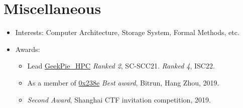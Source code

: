 \documentclass{resume}
\newcommand{\en}[1]{#1}
\newcommand{\zh}[1]{}
\begin{document}
\section{\en{Miscellaneous}\zh{其他}}
\begin{itemize}
      \item \en{Interests: Computer Architecture, Storage System, Formal Methods, etc.}
            \zh{兴趣：高性能计算、体系结构、存储、形式化验证安全等。}
      \item \en{Awards:}
      \zh{所获奖项：}
      \begin{itemize}
      \item \en{Lead \href{https://hpc.geekpie.club}{GeekPie\_HPC} \textit{Ranked 2}, SC-SCC21. \textit{Ranked 4}, ISC22.}
            \zh{带领\href{https://hpc.geekpie.club}{GeekPie\_HPC} SCC21 团队第2名，ISC22 团队第4名}
      \item \en{As a member of \href{https://github.com/0x238e/Vchain}{0x238e} \textit{Best award}, Bitrun, Hang Zhou, 2019.}
            \zh{带领\href{https://github.com/0x238e/Vchain}{0x238e} Bitrun Hackathon 比赛最佳奖}
      \item \en{\textit{Second Award}, Shanghai CTF invitation competition, 2019.}
            \zh{上海2019年 CTF 邀请赛比赛二等奖}
      \end{itemize}
\end{itemize}
\end{document}
